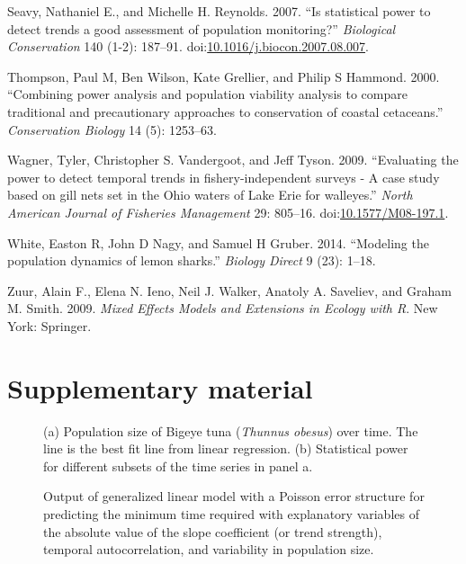\documentclass[12pt,]{article}
\begin{document}
\hypertarget{ref-Seavy2007}{}
Seavy, Nathaniel E., and Michelle H. Reynolds. 2007. ``Is statistical
power to detect trends a good assessment of population monitoring?''
\emph{Biological Conservation} 140 (1-2): 187--91.
doi:\href{https://doi.org/10.1016/j.biocon.2007.08.007}{10.1016/j.biocon.2007.08.007}.

\hypertarget{ref-Thompson2000}{}
Thompson, Paul M, Ben Wilson, Kate Grellier, and Philip S Hammond. 2000.
``Combining power analysis and population viability analysis to compare
traditional and precautionary approaches to conservation of coastal
cetaceans.'' \emph{Conservation Biology} 14 (5): 1253--63.

\hypertarget{ref-Wagner2009}{}
Wagner, Tyler, Christopher S. Vandergoot, and Jeff Tyson. 2009.
``Evaluating the power to detect temporal trends in fishery-independent
surveys - A case study based on gill nets set in the Ohio waters of Lake
Erie for walleyes.'' \emph{North American Journal of Fisheries
Management} 29: 805--16.
doi:\href{https://doi.org/10.1577/M08-197.1}{10.1577/M08-197.1}.

\hypertarget{ref-White2014}{}
White, Easton R, John D Nagy, and Samuel H Gruber. 2014. ``Modeling the
population dynamics of lemon sharks.'' \emph{Biology Direct} 9 (23):
1--18.

\hypertarget{ref-Zuur2009}{}
Zuur, Alain F., Elena N. Ieno, Neil J. Walker, Anatoly A. Saveliev, and
Graham M. Smith. 2009. \emph{Mixed Effects Models and Extensions in
Ecology with R}. New York: Springer.

\clearpage

\section{Supplementary material}\label{supplementary-material}

\setcounter{figure}{0} \renewcommand{\thefigure}{A\arabic{figure}}

\begin{figure}[htbp]
\centering
\caption{(a) Population size of Bigeye tuna (\emph{Thunnus obesus}) over
time. The line is the best fit line from linear regression. (b)
Statistical power for different subsets of the time series in panel
a.\label{fig:empirical_approach_example}}
\end{figure}

\begin{figure}[htbp]
\centering
\caption{Output of generalized linear model with a Poisson error
structure for predicting the minimum time required with explanatory
variables of the absolute value of the slope coefficient (or trend
strength), temporal autocorrelation, and variability in population
size.\label{fig:poisson_model}}
\end{figure}
\end{document}
